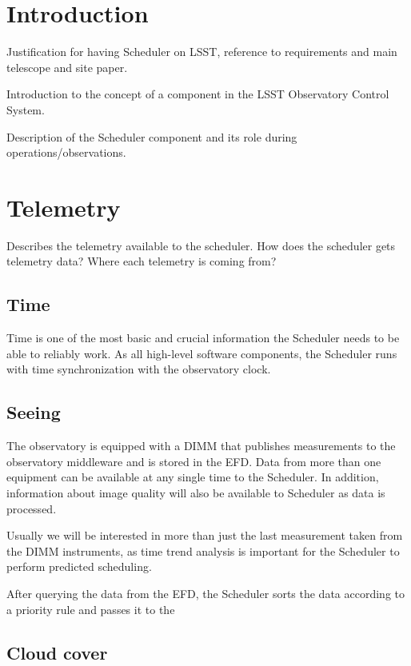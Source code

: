 \section{Introduction}

Justification for having Scheduler on LSST, reference to requirements and main telescope and site paper. 

Introduction to the concept of a component in the LSST Observatory Control System. 

Description of the Scheduler component and its role during operations/observations. 

\section{Telemetry}

Describes the telemetry available to the scheduler. How does the scheduler gets telemetry data? 
Where each telemetry is coming from?

\subsection{Time}

Time is one of the most basic and crucial information the Scheduler needs to be able to reliably work. As all 
high-level software components, the Scheduler runs with time synchronization with the observatory clock. 

\subsection{Seeing}

The observatory is equipped with a DIMM that publishes measurements to the observatory middleware and is stored in 
the EFD. Data from more than one equipment can be available at any single time to the Scheduler. In addition, information
about image quality will also be available to Scheduler as data is processed. 

Usually we will be interested in more than just the last measurement taken from the DIMM instruments, as time trend analysis 
is important for the Scheduler to perform predicted scheduling. 

After querying the data from the EFD, the Scheduler sorts the data according to a priority rule and passes it to the 

\subsection{Cloud cover}

